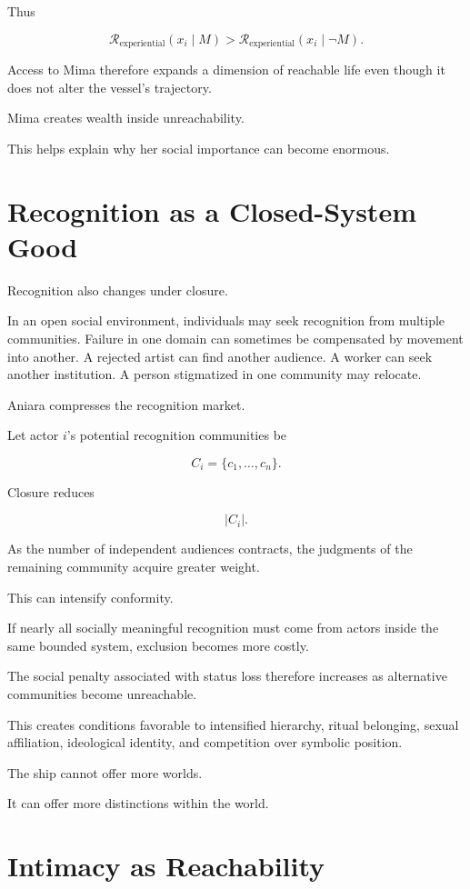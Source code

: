 \documentclass[11pt,oneside]{book}
\theoremstyle{definition}
\theoremstyle{remark}
\newcommand{\R}{\mathcal{R}}
\begin{document}
Thus

\[
\R_{\mathrm{experiential}}(x_i\mid M)
>
\R_{\mathrm{experiential}}(x_i\mid \neg M).
\]

Access to Mima therefore expands a dimension of reachable life even though it does not alter the vessel's trajectory.

Mima creates wealth inside unreachability.

This helps explain why her social importance can become enormous.

\section{Recognition as a Closed-System Good}

Recognition also changes under closure.

In an open social environment, individuals may seek recognition from multiple communities. Failure in one domain can sometimes be compensated by movement into another. A rejected artist can find another audience. A worker can seek another institution. A person stigmatized in one community may relocate.

Aniara compresses the recognition market.

Let actor \(i\)'s potential recognition communities be

\[
C_i
=
\{c_1,\ldots,c_n\}.
\]

Closure reduces

\[
|C_i|.
\]

As the number of independent audiences contracts, the judgments of the remaining community acquire greater weight.

This can intensify conformity.

If nearly all socially meaningful recognition must come from actors inside the same bounded system, exclusion becomes more costly.

The social penalty associated with status loss therefore increases as alternative communities become unreachable.

This creates conditions favorable to intensified hierarchy, ritual belonging, sexual affiliation, ideological identity, and competition over symbolic position.

The ship cannot offer more worlds.

It can offer more distinctions within the world.

\section{Intimacy as Reachability}
\end{document}
